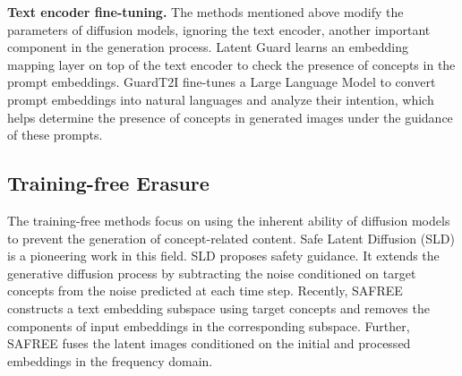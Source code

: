 \textbf{Text encoder fine-tuning.} The methods mentioned above modify the parameters of diffusion models, ignoring the text encoder, another important component in the generation process. Latent Guard \cite{liu2025latent} learns an embedding mapping layer on top of the text encoder to check the presence of concepts in the prompt embeddings. GuardT2I \cite{yang2024guardt2i} fine-tunes a Large Language Model to convert prompt embeddings into natural languages and analyze their intention, which helps determine the presence of concepts in generated images under the guidance of these prompts.



\subsection{Training-free Erasure}

The training-free methods focus on using the inherent ability of diffusion models to prevent the generation of concept-related content. Safe Latent Diffusion (SLD) \cite{schramowski2023safe} is a pioneering work in this field. SLD proposes safety guidance. It extends the generative diffusion process by subtracting the noise conditioned on target concepts from the noise predicted at each time step. Recently, SAFREE \cite{yoon2024safree} constructs a text embedding subspace using target concepts and removes the components of input embeddings in the corresponding subspace. Further, SAFREE fuses the latent images conditioned on the initial and processed embeddings in the frequency domain.


